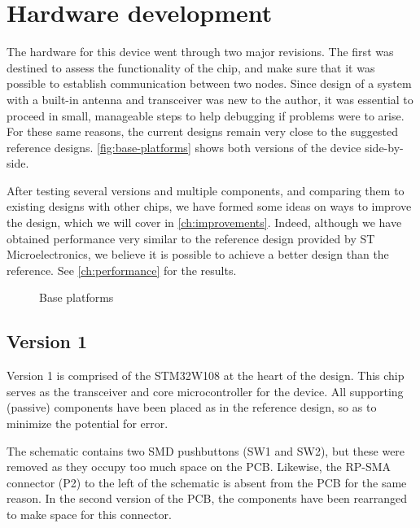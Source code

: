 \chapter{Hardware development}\label{ch:examples}

The hardware for this device went through two major revisions. The first was
destined to assess the functionality of the chip, and make sure that it was
possible to establish communication between two nodes. Since design of a system
with a built-in antenna and transceiver was new to the author, it was essential
to proceed in small, manageable steps to help debugging if problems were to
arise. For these same reasons, the current designs remain very close to the
suggested reference designs. \autoref{fig:base-platforms} shows both versions of
the device side-by-side.

After testing several versions and multiple components, and comparing them to
existing designs with other chips, we have formed some ideas on ways to improve
the design, which we will cover in \autoref{ch:improvements}.
Indeed, although we have obtained performance very similar to the reference
design provided by ST Microelectronics, we believe it is possible to achieve
a better design than the reference. See \autoref{ch:performance} for the
results.

\begin{figure}[bth]
  \myfloatalign
  \caption{Base platforms}
  \label{fig:base-platforms}
\end{figure}


\section{Version 1}\label{sec:v1}

Version 1 is comprised of the STM32W108 at the heart of the design. This chip
serves as the transceiver and core microcontroller for the device. All
supporting (passive) components have been placed as in the reference design, so
as to minimize the potential for error. 

The schematic contains two SMD pushbuttons (SW1 and SW2), but these were removed
as they occupy too much space on the PCB. Likewise, the RP-SMA connector (P2) to
the left of the schematic is absent from the PCB for the same reason. In the
second version of the PCB, the components have been rearranged to make space for
this connector.

